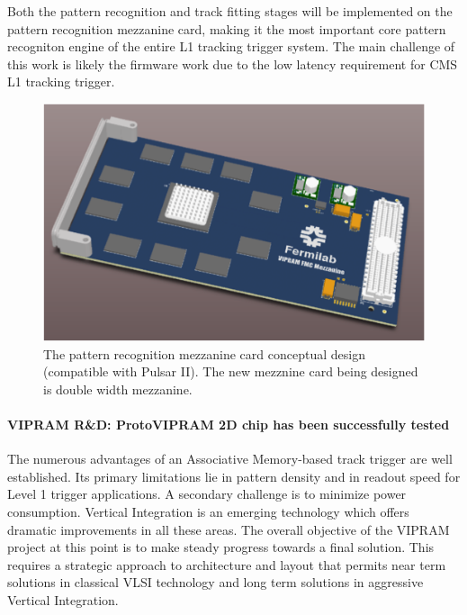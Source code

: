 Both the pattern recognition and track fitting stages will be implemented on the pattern recognition mezzanine card, making it the most important core pattern recogniton engine of the entire L1 tracking trigger system. The main challenge of this work is likely the firmware work due to the low latency requirement for CMS L1 tracking trigger. 

\begin{figure}[ht!]
\centering

\includegraphics[width=0.6\columnwidth]{Plots/mezzanine-concept.png}
\caption{The pattern recognition mezzanine card conceptual design (compatible with Pulsar II). The new mezznine card being designed is double width mezzanine.}
\label{fig:mezzanine-concept}
\end{figure}


\paragraph{VIPRAM R\&D: ProtoVIPRAM 2D chip has been successfully tested}

The numerous advantages of an Associative Memory-based track trigger are well established.  Its primary limitations lie in pattern density and in readout speed for Level 1 trigger applications.  A secondary challenge is to minimize power consumption.  Vertical Integration is an emerging technology which offers dramatic improvements in all these areas.  The overall objective of the VIPRAM project at this point is to make steady progress towards a final solution.  This requires a strategic approach to architecture and layout that permits near term solutions in classical VLSI technology and long term solutions in aggressive Vertical Integration. 

